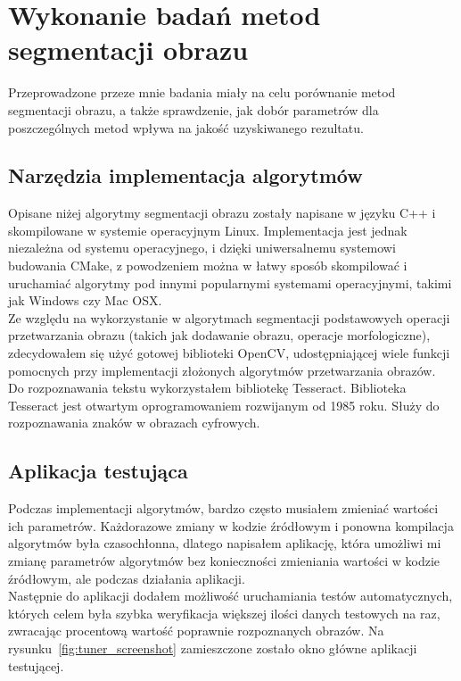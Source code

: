 \section{Wykonanie badań metod segmentacji obrazu}
Przeprowadzone przeze mnie badania miały na celu porównanie metod segmentacji obrazu, a także sprawdzenie, jak dobór parametrów dla poszczególnych metod wpływa na jakość uzyskiwanego rezultatu.

\subsection{Narzędzia implementacja algorytmów}
Opisane niżej algorytmy segmentacji obrazu zostały napisane w języku C++ i skompilowane w systemie operacyjnym Linux. Implementacja jest jednak niezależna od systemu operacyjnego, i dzięki uniwersalnemu systemowi budowania CMake, z powodzeniem można w łatwy sposób skompilować i uruchamiać algorytmy pod innymi popularnymi systemami operacyjnymi, takimi jak Windows czy Mac OSX.\\
Ze względu na wykorzystanie w algorytmach segmentacji podstawowych operacji przetwarzania obrazu (takich jak dodawanie obrazu, operacje morfologiczne), zdecydowałem się użyć gotowej biblioteki OpenCV, udostępniającej wiele funkcji pomocnych przy implementacji złożonych algorytmów przetwarzania obrazów.\\
Do rozpoznawania tekstu wykorzystałem bibliotekę Tesseract. Biblioteka Tesseract jest otwartym oprogramowaniem rozwijanym od 1985 roku. Służy do rozpoznawania znaków w obrazach cyfrowych.
\subsection{Aplikacja testująca}
Podczas implementacji algorytmów, bardzo często musiałem zmieniać wartości ich parametrów. Każdorazowe zmiany w kodzie źródłowym i ponowna kompilacja algorytmów była czasochłonna, dlatego napisałem aplikację, która umożliwi mi zmianę parametrów algorytmów bez konieczności zmieniania wartości w kodzie źródłowym, ale podczas działania aplikacji.\\
Następnie do aplikacji dodałem możliwość uruchamiania testów automatycznych, których celem była szybka weryfikacja większej ilości danych testowych na raz, zwracając procentową wartość poprawnie rozpoznanych obrazów. Na rysunku~\ref{fig:tuner_screenshot} zamieszczone zostało okno główne aplikacji testującej.

